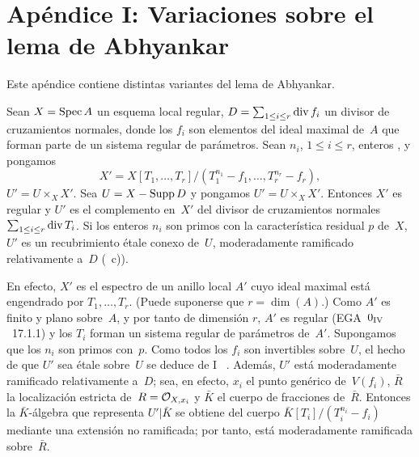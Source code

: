 
\section{Apéndice I: Variaciones sobre el lema de Abhyankar}
\label{XIII.5}
%
Este apéndice contiene distintas variantes del lema de Abhyankar.

\begin{proposition}
\label{XIII.5.1} Sean $X=\Spec A$ un esquema local regular,
$D=\sum_{1\leq i\leq r} \divisor f_i$ un divisor de cruzamientos
normales, donde los $f_i$ son elementos del ideal maximal de~$A$ que
forman parte de un sistema regular de parámetros. Sean $n_i$,
$1\leq i\leq r$, enteros
, y pongamos
$$
X'=X[T_1,\dots,T_r]/(T_1^{n_1}-f_1,\dots,T_r^{n_r}-f_r),
$$
{$U'=U\times_X X'$.}
{Sea $U=X-\Supp D$ y pongamos $U'=U\times_X X'$.}
Entonces $X'$ es regular y $U'$ es el complemento
en~$X'$ del divisor de cruzamientos normales
$\sum_{1\leq i\leq r}\divisor T_i$. Si los enteros $n_i$ son primos
con la característica residual $p$ de~$X$, $U'$ es un recubrimiento
étale conexo de~$U$, moderadamente ramificado relativamente
a~$D$ \textup{(~c))}.
\end{proposition}

En efecto, $X'$ es el espectro de un anillo local $A'$ cuyo ideal
maximal está engendrado por $T_1,\dots,T_r$.
{\ignorespaces}
{(Puede suponerse que $r=\dim(A)$.)}
Como $A'$ es finito y plano sobre~$A$, y por tanto de dimensión $r$,
$A'$ es regular (EGA~$0_{\textup{IV}}$~17.1.1) y los $T_i$ forman un
sistema regular de parámetros de~$A'$. Supongamos que los $n_i$ son
primos con~$p$. Como todos los $f_i$ son invertibles sobre~$U$, el
hecho de que $U'$ sea étale sobre~$U$ se deduce de
{I~}
{}.
Además, $U'$ está moderadamente ramificado relativamente a~$D$; sea,
en efecto, $x_i$ el punto genérico de~$V(f_i)$, $\bar{R}$ la
localización estricta de~$R=\cal{O}_{X,x_i}$ y $\bar{K}$ el cuerpo de
fracciones de~$\bar{R}$. Entonces la $\bar{K}$-álgebra que
representa $U'|\bar{K}$ se obtiene del cuerpo
$\bar{K}[T_i]/(T_i^{n_i}-f_i)$ mediante una extensión no ramificada;
por tanto, está moderadamente ramificada sobre~$\bar{R}$.
